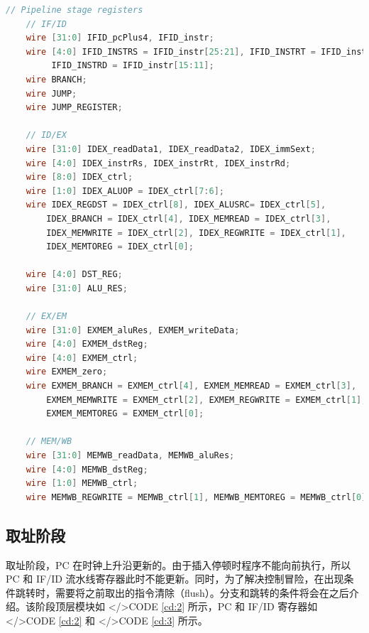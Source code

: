 \documentclass{progartcn}
\begin{document}
\begin{lstlisting}[language=verilog,caption={常用管线.v},label={cd:1}]
    // Pipeline stage registers
    // IF/ID
    wire [31:0] IFID_pcPlus4, IFID_instr;
    wire [4:0] IFID_INSTRS = IFID_instr[25:21], IFID_INSTRT = IFID_instr[20:16],
         IFID_INSTRD = IFID_instr[15:11];
    wire BRANCH;
    wire JUMP;
    wire JUMP_REGISTER;
    
    // ID/EX
    wire [31:0] IDEX_readData1, IDEX_readData2, IDEX_immSext;
    wire [4:0] IDEX_instrRs, IDEX_instrRt, IDEX_instrRd;
    wire [8:0] IDEX_ctrl;
    wire [1:0] IDEX_ALUOP = IDEX_ctrl[7:6];
    wire IDEX_REGDST = IDEX_ctrl[8], IDEX_ALUSRC= IDEX_ctrl[5], 
        IDEX_BRANCH = IDEX_ctrl[4], IDEX_MEMREAD = IDEX_ctrl[3], 
        IDEX_MEMWRITE = IDEX_ctrl[2], IDEX_REGWRITE = IDEX_ctrl[1],
        IDEX_MEMTOREG = IDEX_ctrl[0];
        
    wire [4:0] DST_REG;
    wire [31:0] ALU_RES;
        
    // EX/EM
    wire [31:0] EXMEM_aluRes, EXMEM_writeData;
    wire [4:0] EXMEM_dstReg;
    wire [4:0] EXMEM_ctrl;
    wire EXMEM_zero;
    wire EXMEM_BRANCH = EXMEM_ctrl[4], EXMEM_MEMREAD = EXMEM_ctrl[3],
        EXMEM_MEMWRITE = EXMEM_ctrl[2], EXMEM_REGWRITE = EXMEM_ctrl[1],
        EXMEM_MEMTOREG = EXMEM_ctrl[0];
        
    // MEM/WB
    wire [31:0] MEMWB_readData, MEMWB_aluRes;
    wire [4:0] MEMWB_dstReg;
    wire [1:0] MEMWB_ctrl;
    wire MEMWB_REGWRITE = MEMWB_ctrl[1], MEMWB_MEMTOREG = MEMWB_ctrl[0];
\end{lstlisting}

\subsection{取址阶段}

取址阶段，PC 在时钟上升沿更新的。由于插入停顿时程序不能向前执行，所以 PC 和 IF/ID 流水线寄存器此时不能更新。同时，为了解决控制冒险，在出现条件跳转时，需要将之前取出的指令清除（flush）。分支和跳转的条件将会在之后介绍。该阶段顶层模块如 </>CODE \ref{cd:2} 所示，PC 和 IF/ID 寄存器如 </>CODE \ref{cd:2} 和 </>CODE \ref{cd:3} 所示。 
\end{document}
